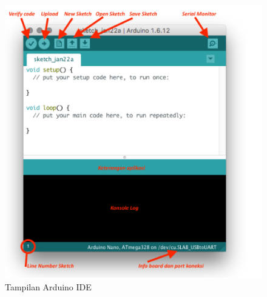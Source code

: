 \begin{figure}[H]
\centering
\includegraphics[width=1\textwidth]{figures/arduino.png}
\caption{Tampilan Arduino IDE}
\label{print}
\end{figure}

